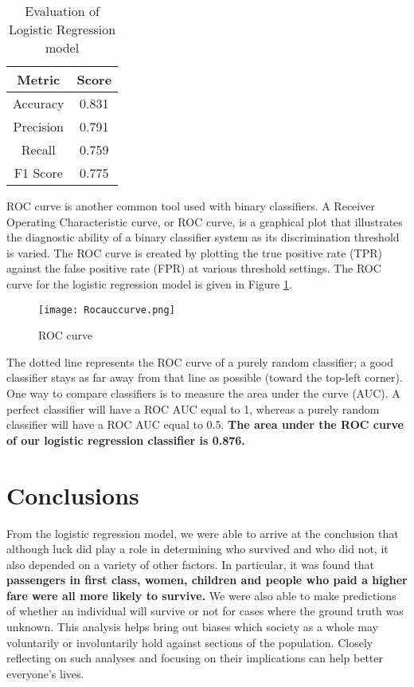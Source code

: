 \documentclass[conference]{IEEEtran}
\begin{document}
\begin{table}
\begin{center}

\caption{Evaluation of Logistic Regression model}

\begin{tabular}{| c| c| }
 \hline
 Metric & Score \\
 \hline
 \hline
 Accuracy & 0.831 \\ 
 \hline
 Precision & 0.791 \\   
 \hline
 Recall & 0.759 \\
 \hline
 F1 Score & 0.775 \\
 \hline

\end{tabular}

\label{metric_table}
\end{center}

\end{table}

ROC curve is another common tool used with binary classifiers. A Receiver Operating Characteristic curve, or ROC curve, is a graphical plot that illustrates the diagnostic ability of a binary classifier system as its discrimination threshold is varied. The ROC curve is created by plotting the true positive rate (TPR) against the false positive rate (FPR) at various threshold settings. The ROC curve for the logistic regression model is given in Figure \ref{Rocauccurve}.

\begin{figure}[tbh]
\centering
\texttt{[image: Rocauccurve.png]}
\caption{ROC curve}
\label{Rocauccurve}
\end{figure}

The dotted line represents the ROC curve of a purely random classifier; a good classifier stays as far away from that line as possible (toward the top-left corner). One way to compare classifiers is to measure the area under the curve (AUC). A perfect classifier will have a ROC AUC equal to 1, whereas a purely random classifier will have a ROC AUC equal to 0.5. \textbf{The area under the ROC curve of our logistic regression classifier is 0.876.}

\section{Conclusions}

From the logistic regression model, we were able to arrive at the conclusion that although luck did play a role in determining who survived and who did not, it also depended on a variety of other factors. In particular, it was found that \textbf{passengers in first class, women, children and people who paid a higher fare were all more likely to survive.} We were also able to make predictions of whether an individual will survive or not for cases where the ground truth was unknown. This analysis helps bring out biases which society as a whole may voluntarily or involuntarily hold against sections of the population. Closely reflecting on such analyses and focusing on their implications can help better everyone's lives.
\end{document}
